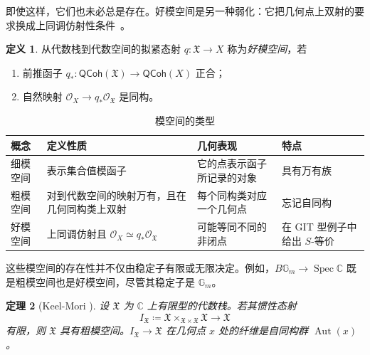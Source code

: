 \documentclass{amsart}
\newtheorem{thm}{定理}[section]
\theoremstyle{definition}
\newtheorem{defn}[thm]{定义}
\theoremstyle{remark}
\theoremstyle{plain}
\theoremstyle{definition}
\theoremstyle{remark}
\newcommand{\G}{\mathbb{G}}
\newcommand{\C}{\mathbb{C}}
\newcommand{\mc}[1]{\mathcal{#1}}
\newcommand{\mf}[1]{\mathfrak{#1}}
\newcommand{\on}[1]{\operatorname{#1}}
\newcommand{\ms}[1]{\mathsf{#1}}
\newcommand{\1}{\mathbf{1}}
\newcommand{\2}{\mathbf{2}}
\newcommand{\3}{\mathbf{3}}
\begin{document}
即使这样，它们也未必总是存在。好模空间是另一种弱化：它把几何点上双射的要求换成上同调仿射性条件~\cite{Alper2013}。

\begin{defn}
    从代数栈到代数空间的拟紧态射 \(q\colon\mf{X}\to X\) 称为\textit{好模空间}，若
    \begin{enumerate}
        \item 前推函子 \(q_*\colon\ms{QCoh}(\mf{X})\to\ms{QCoh}(X)\) 正合；
        \item 自然映射 \(\mc{O}_X\to q_*\mc{O}_{\mf{X}}\) 是同构。
    \end{enumerate}
\end{defn}

\begin{table}[htpb]
    \centering
    \caption{模空间的类型}
    \label{tab:moduli-types-corrected}
    \renewcommand{\arraystretch}{1.3}
    \begin{tabular}{
        p{}
        p{}
        p{}
        p{}
    }
        \toprule
        \textbf{概念}
        & \textbf{定义性质}
        & \textbf{几何表现}
        & \textbf{特点}
        \\
        \midrule
        细模空间
        & 表示集合值模函子
        & 它的点表示函子所记录的对象
        & 具有万有族
        \\
        粗模空间
        & 对到代数空间的映射万有，且在几何同构类上双射
        & 每个同构类对应一个几何点
        & 忘记自同构
        \\
        好模空间
        & 上同调仿射且
          \(\mc{O}_X \simeq q_*\mc{O}_{\mf{X}}\)
        & 可能等同不同的非闭点
        & 在 GIT 型例子中给出 \(S\)-等价
        \\
        \bottomrule
    \end{tabular}
\end{table}

这些模空间的存在性并不仅由稳定子有限或无限决定。例如，\(B\G_m\to\on{Spec}\C\) 既是粗模空间也是好模空间，尽管其稳定子是 \(\G_m\)。

\begin{thm}[Keel-Mori {\cite{KeelMori1997}}]
    设 \(\mf{X}\) 为 \(\C\) 上有限型的代数栈。若其惯性态射
    \[
        I_{\mf{X}}
        \coloneqq
        \mf{X}\times_{\mf{X}\times\mf{X}}\mf{X}
        \longrightarrow \mf{X}
    \]
    有限，则 \(\mf{X}\) 具有粗模空间。\(I_{\mf{X}}\to\mf{X}\) 在几何点 \(x\) 处的纤维是自同构群 \(\on{Aut}(x)\)。
\end{thm}
\end{document}
